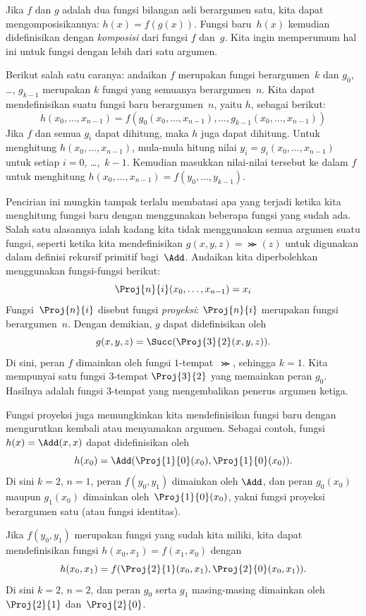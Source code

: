 \documentclass[../../../include/open-logic-section]{subfiles}
\begin{document}

Jika $f$ dan $g$ adalah dua fungsi bilangan asli berargumen satu, kita dapat
mengomposisikannya: $h(x) = f(g(x))$. Fungsi baru~$h(x)$ kemudian
didefinisikan dengan \emph{komposisi} dari fungsi $f$ dan~$g$. Kita ingin
memperumum hal ini untuk fungsi dengan lebih dari satu argumen.

Berikut salah satu caranya: andaikan $f$ merupakan fungsi berargumen~$k$ dan
$g_0$, \dots, $g_{k-1}$ merupakan $k$ fungsi yang semuanya berargumen~$n$.
Kita dapat mendefinisikan suatu fungsi baru berargumen~$n$, yaitu $h$, sebagai
berikut:
\[
h(x_0, \dots, x_{n-1}) =
f(g_0(x_0, \dots, x_{n-1}), \dots, g_{k-1}(x_0, \dots, x_{n-1}))
\]
Jika $f$ dan semua $g_i$ dapat dihitung, maka $h$ juga dapat dihitung. Untuk
menghitung $h(x_0, \dots, x_{n-1})$, mula-mula hitung nilai
$y_i = g_i(x_0, \dots, x_{n-1})$ untuk setiap $i = 0$, \dots,~$k-1$.
Kemudian masukkan nilai-nilai tersebut ke dalam $f$ untuk menghitung
$h(x_0, \dots, x_{n-1}) = f(y_0, \dots, y_{k-1})$.

Pencirian ini mungkin tampak terlalu membatasi apa yang terjadi ketika kita
menghitung fungsi baru dengan menggunakan beberapa fungsi yang sudah ada.
Salah satu alasannya ialah kadang kita tidak menggunakan semua argumen suatu
fungsi, seperti ketika kita mendefinisikan $g(x, y, z) = \Succ(z)$ untuk
digunakan dalam definisi rekursif primitif bagi~$\Add$. Andaikan kita
diperbolehkan menggunakan fungsi-fungsi berikut:
\[
\Proj{n}{i}(x_0, \dots, x_{n-1}) = x_i
\]
Fungsi~$\Proj{n}{i}$ disebut fungsi \emph{proyeksi}: $\Proj{n}{i}$ merupakan
fungsi berargumen~$n$. Dengan demikian, $g$ dapat didefinisikan oleh
\[
g(x, y, z) = \Succ(\Proj{3}{2}(x, y, z)).
\]
Di sini, peran $f$ dimainkan oleh fungsi $1$-tempat~$\Succ$, sehingga
$k=1$. Kita mempunyai satu fungsi $3$-tempat $\Proj{3}{2}$ yang memainkan
peran $g_0$. Hasilnya adalah fungsi $3$-tempat yang mengembalikan penerus
argumen ketiga.

Fungsi proyeksi juga memungkinkan kita mendefinisikan fungsi baru dengan
mengurutkan kembali atau menyamakan argumen. Sebagai contoh, fungsi $h(x) =
\Add(x, x)$ dapat didefinisikan oleh
\[
h(x_0) = \Add(\Proj{1}{0}(x_0),\Proj{1}{0}(x_0)).
\]
Di sini $k=2$, $n=1$, peran $f(y_0,y_1)$ dimainkan oleh $\Add$, dan peran
$g_0(x_0)$ maupun $g_1(x_0)$ dimainkan oleh~$\Proj{1}{0}(x_0)$, yakni fungsi
proyeksi berargumen satu (atau fungsi identitas).

Jika $f(y_0, y_1)$ merupakan fungsi yang sudah kita miliki, kita dapat
mendefinisikan fungsi $h(x_0, x_1) = f(x_1, x_0)$ dengan
\[
h(x_0, x_1) = f(\Proj{2}{1}(x_0, x_1),\Proj{2}{0}(x_0, x_1)).
\]
Di sini $k=2$, $n = 2$, dan peran $g_0$ serta $g_1$ masing-masing dimainkan
oleh $\Proj{2}{1}$ dan~$\Proj{2}{0}$.
\end{document}
